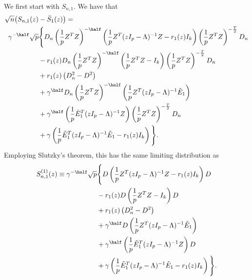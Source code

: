 We first start with $S_{n,1}$.  We have that
\begin{align*}
    \sqrt{n} \big( S_{n,1} (z) &- \bar S_1 (z) \big) = \\
        \gamma^{-\half} \sqrt{p} &\Bigg\{
            D_n 
            \left( \frac{1}{p} Z^T Z \right)^{-\half}
            \left(
                \frac{1}{p} Z^T (z I_p - \Lambda)^{-1} Z
                -
                r_1(z) I_k
            \right)
            \left( \frac{1}{p} Z^T Z \right)^{-\Thalf}
            D_n \\
            &-{}
            r_1(z)
            D_n 
            \left( \frac{1}{p} Z^T Z \right)^{-\half}
            \left(
                \frac{1}{p} Z^T Z - I_k
            \right)
            \left( \frac{1}{p} Z^T Z \right)^{-\Thalf}
            D_n \\
            &+{}
            r_1(z) \left( D_n^2 - D^2 \right) \\
            &+{}
            \gamma^\half
            D_n 
            \left( \frac{1}{p} Z^T Z \right)^{-\half}
            \left(
                \frac{1}{p} Z^T (z I_p - \Lambda)^{-1} \tilde E_1
            \right) \\
            &+{}
            \gamma^\half
            \left(
                \frac{1}{p} \tilde E_1^T (z I_p - \Lambda)^{-1} Z
            \right)
            \left( \frac{1}{p} Z^T Z \right)^{-\Thalf}
            D_n \\
            &+{}
            \gamma
            \left(
                \frac{1}{p} \tilde E_1^T (z I_p - \Lambda)^{-1} \tilde E_1
                -
                r_1(z) I_k
            \right)
        \Bigg\}.
\end{align*}
Employing Slutzky's theorem, this has the same limiting distribution as
\begin{align*}
    S_{n,1}^{(1)}(z) \equiv 
        \gamma^{-\half} \sqrt{p} &\Bigg\{
            D
            \left(
                \frac{1}{p} Z^T (z I_p - \Lambda)^{-1} Z
                -
                r_1(z) I_k
            \right)
            D \\
            &-{}
            r_1(z)
            D
            \left(
                \frac{1}{p} Z^T Z - I_k
            \right)
            D \\
            &+{}
            r_1(z) \left( D_n^2 - D^2 \right) \\
            &+{}
            \gamma^\half
            D 
            \left(
                \frac{1}{p} Z^T (z I_p - \Lambda)^{-1} \tilde E_1
            \right) \\
            &+{}
            \gamma^\half
            \left(
                \frac{1}{p} \tilde E_1^T (z I_p - \Lambda)^{-1} Z
            \right)
            D \\
            &+{}
            \gamma
            \left(
                \frac{1}{p} \tilde E_1^T (z I_p - \Lambda)^{-1} \tilde E_1
                -
                r_1(z) I_k
            \right)
        \Bigg\}.
\end{align*}
